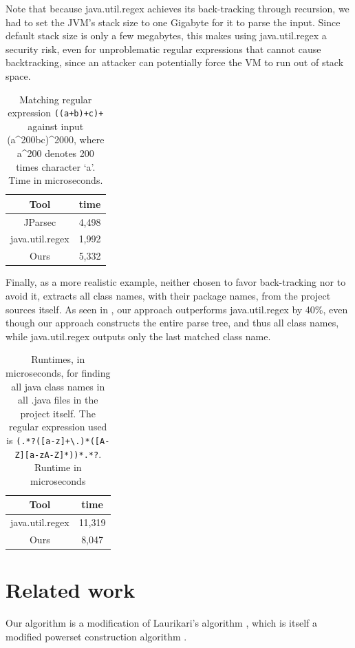 \documentclass[english]{sigplanconf}
\theoremstyle{definition}
\begin{document}

Note that because java.util.regex achieves its back-tracking through recursion,
we had to set the JVM's stack size to one Gigabyte for it to parse the input.
Since default stack size is only a few megabytes, this makes using
java.util.regex a security risk, even for unproblematic regular expressions
that cannot cause backtracking, since an attacker can potentially force the VM to run 
out of stack space.

\begin{table}
\begin{tabular}{cc}
\hline 
Tool & time\tabularnewline
\hline 
\hline 
JParsec & 4,498\tabularnewline
\hline 
java.util.regex & 1,992\tabularnewline
\hline 
Ours & 5,332\tabularnewline
\hline 
\end{tabular}
\caption{Matching regular expression \texttt{((a+b)+c)+} against input (a\^{}200bc)\^{}2000, where a\^{}200 denotes 200 times character `a'. Time in microseconds.}
\end{table}

Finally, as a more realistic example, neither chosen to favor
back-tracking nor to avoid it,  extracts all class names, with their
package names, from the project sources itself.  As seen in
, our approach outperforms java.util.regex by 40\%,
even though our approach constructs the entire parse tree, and thus
all class names, while java.util.regex outputs only the last matched
class name.

\begin{table}
\begin{tabular}{cc}
\hline 
Tool & time\tabularnewline
\hline 
\hline 
java.util.regex & 11,319\tabularnewline
\hline 
Ours & 8,047\tabularnewline
\hline 
\end{tabular}
\caption{Runtimes, in microseconds, for finding all java class names in all .java files in the project itself. The regular expression used is 
\texttt{(.*?([a-z]+\textbackslash.)*([A-Z][a-zA-Z]*))*.*?}.
Runtime in microseconds}
\end{table}


\section{Related work}
Our algorithm is a modification of Laurikari's algorithm \cite{Laur00a},
which is itself a modified powerset construction algorithm \cite[p. 55]{Sips05a}.
\end{document}
